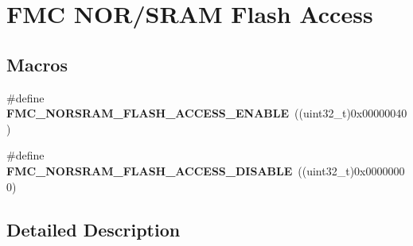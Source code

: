 \hypertarget{group___f_m_c___n_o_r_s_r_a_m___flash___access}{}\section{F\+MC N\+O\+R/\+S\+R\+AM Flash Access}
\label{group___f_m_c___n_o_r_s_r_a_m___flash___access}
\subsection*{Macros}
\begin{DoxyCompactItemize}
\item 
\#define {\bfseries F\+M\+C\+\_\+\+N\+O\+R\+S\+R\+A\+M\+\_\+\+F\+L\+A\+S\+H\+\_\+\+A\+C\+C\+E\+S\+S\+\_\+\+E\+N\+A\+B\+LE}~((uint32\+\_\+t)0x00000040)\hypertarget{group___f_m_c___n_o_r_s_r_a_m___flash___access_ga6d3f3cbae61452a085ff8dbe2b3ae7c9}{}\label{group___f_m_c___n_o_r_s_r_a_m___flash___access_ga6d3f3cbae61452a085ff8dbe2b3ae7c9}

\item 
\#define {\bfseries F\+M\+C\+\_\+\+N\+O\+R\+S\+R\+A\+M\+\_\+\+F\+L\+A\+S\+H\+\_\+\+A\+C\+C\+E\+S\+S\+\_\+\+D\+I\+S\+A\+B\+LE}~((uint32\+\_\+t)0x00000000)\hypertarget{group___f_m_c___n_o_r_s_r_a_m___flash___access_gada21371f712db11ebd92f152f712a2bf}{}\label{group___f_m_c___n_o_r_s_r_a_m___flash___access_gada21371f712db11ebd92f152f712a2bf}

\end{DoxyCompactItemize}


\subsection{Detailed Description}
